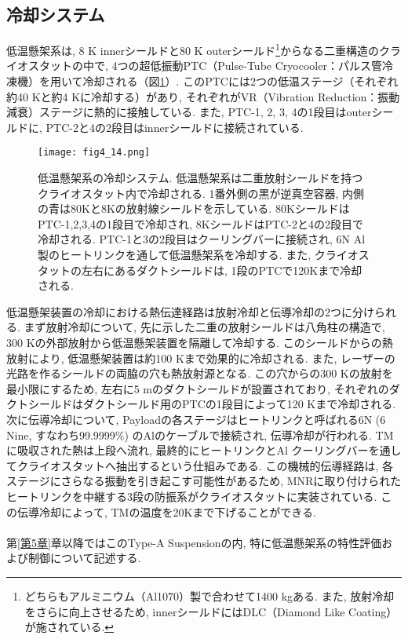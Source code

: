 \subsection{冷却システム}
低温懸架系は, 8 K innerシールドと80 K outerシールド\footnote{どちらもアルミニウム（Al1070）製で合わせて1400 kgある. また, 放射冷却をさらに向上させるため, innerシールドにはDLC（Diamond Like Coating）が施されている. }からなる二重構造のクライオスタットの中で, 4つの超低振動PTC（Pulse-Tube Cryocooler：パルス管冷凍機）を用いて冷却される（図\ref{fig4.14}）. このPTCには2つの低温ステージ（それぞれ約40 Kと約4 Kに冷却する）があり, それぞれがVR（Vibration Reduction：振動減衰）ステージに熱的に接触している. また, PTC-1, 2, 3, 4の1段目はouterシールドに, PTC-2と4の2段目はinnerシールドに接続されている\cite{49}. 
\begin{figure}[H]
\begin{center}
\texttt{[image: fig4\_14.png]} 
\caption[低温懸架系の冷却システム]{低温懸架系の冷却システム. 低温懸架系は二重放射シールドを持つクライオスタット内で冷却される. 1番外側の黒が逆真空容器, 内側の青は80Kと8Kの放射線シールドを示している. 80KシールドはPTC-1,2,3,4の1段目で冷却され, 8KシールドはPTC-2と4の2段目で冷却される. PTC-1と3の2段目はクーリングバーに接続され, 6N Al製のヒートリンクを通して低温懸架系を冷却する. また, クライオスタットの左右にあるダクトシールドは, 1段のPTCで120Kまで冷却される. }
\label{fig4.14}
\end{center}
\end{figure}
低温懸架装置の冷却における熱伝達経路は放射冷却と伝導冷却の2つに分けられる. まず放射冷却について, 先に示した二重の放射シールドは八角柱の構造で, 300 Kの外部放射から低温懸架装置を隔離して冷却する. このシールドからの熱放射により, 低温懸架装置は約100 Kまで効果的に冷却される. また, レーザーの光路を作るシールドの両脇の穴も熱放射源となる. この穴からの300 Kの放射を最小限にするため, 左右に5 mのダクトシールドが設置されており, それぞれのダクトシールドはダクトシールド用のPTCの1段目によって120 Kまで冷却される\cite{49}. \\
\quad 次に伝導冷却について, Payloadの各ステージはヒートリンクと呼ばれる6N (6 Nine, すなわち99.9999$\%$) のAlのケーブルで接続され, 伝導冷却が行われる\cite{50}. TMに吸収された熱は上段へ流れ, 最終的にヒートリンクとAl クーリングバーを通してクライオスタットへ抽出するという仕組みである. この機械的伝導経路は, 各ステージにさらなる振動を引き起こす可能性があるため, MNRに取り付けられたヒートリンクを中継する3段の防振系がクライオスタットに実装されている. この伝導冷却によって, TMの温度を20Kまで下げることができる. \\\\
\noindent
第\ref{第5章}章以降ではこのType-A Suspensionの内, 特に低温懸架系の特性評価および制御について記述する. 